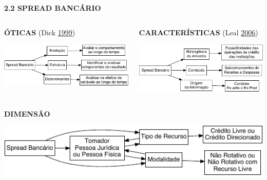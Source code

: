 \documentclass[ignorenonframetext,aspectratio=169,ignorenonframetext]{beamer}
\begin{document}
\begin{frame}{\textbf{2.2 SPREAD BANCÁRIO}}
\protect\hypertarget{spread-bancuxe1rio-1}{}

\begin{columns}[T]
\begin{column}{0.5\textwidth}
\textbf{ÓTICAS} (Dick \protect\hyperlink{ref-dick:1999}{1999})

\begin{center}\includegraphics{01-presentation-V1_files/figure-beamer/diagram.otic-1} \end{center}
\end{column}

\begin{column}{0.5\textwidth}
\textbf{CARACTERÍSTICAS} (Leal \protect\hyperlink{ref-leal:2006}{2006})

\begin{center}\includegraphics{01-presentation-V1_files/figure-beamer/diagram.carac-1} \end{center}
\end{column}
\end{columns}

\textbf{DIMENSÃO}

\begin{center}\includegraphics{01-presentation-V1_files/figure-beamer/d.spread.dim-1} \end{center}

\end{frame}
\end{document}
